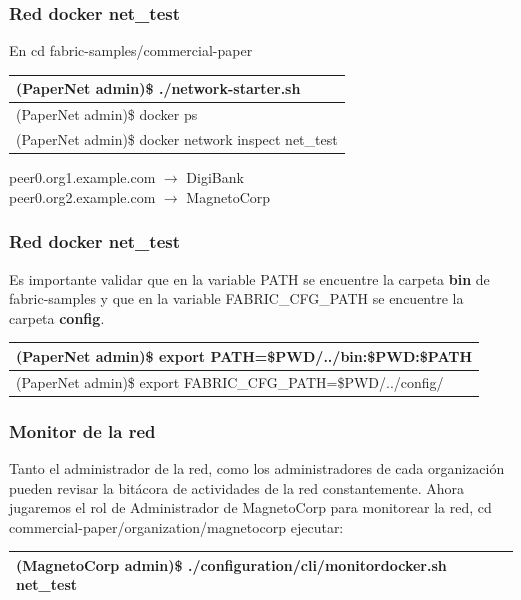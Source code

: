 \documentclass{beamer}
\begin{document}
	\begin{frame}
		\frametitle{Red docker net\_test}
		En cd fabric-samples/commercial-paper\\
		\begin{center}
			\begin{tabulary}{\linewidth}{L}
				\hline
				(PaperNet admin)\$ ./network-starter.sh \\
				\hline 
				(PaperNet admin)\$ docker ps \\
				\hline
				(PaperNet admin)\$ docker network inspect net\_test \\
				\hline
			\end{tabulary} 
		\end{center}
		peer0.org1.example.com $\rightarrow$ DigiBank\\
		peer0.org2.example.com $\rightarrow$ MagnetoCorp
	\end{frame}
	
	\begin{frame}
		\frametitle{Red docker net\_test}
		Es importante validar que en la variable PATH se encuentre la carpeta \textbf{bin} de fabric-samples y que en la variable FABRIC\_CFG\_PATH se encuentre la carpeta \textbf{config}.
		\begin{center}
			\begin{tabulary}{\linewidth}{L}
				\hline
				(PaperNet admin)\$ export PATH=\${PWD}/../bin:\${PWD}:\$PATH\\
				\hline
				(PaperNet admin)\$ export FABRIC\_CFG\_PATH=\$PWD/../config/\\
				\hline
			\end{tabulary} 
		\end{center}
	\end{frame}
	
	\begin{frame}
		\frametitle{Monitor de la red}
		Tanto el administrador de la red, como los administradores de cada organización pueden revisar la bitácora de actividades de la red constantemente. Ahora jugaremos el rol de Administrador de MagnetoCorp para monitorear la red, cd commercial-paper/organization/magnetocorp ejecutar:\\
		\begin{center}
			\begin{tabulary}{\linewidth}{L}
				\hline
				(MagnetoCorp admin)\$ ./configuration/cli/monitordocker.sh net\_test \\
				\hline
			\end{tabulary} 
		\end{center}
	\end{frame}
	
\end{document}
